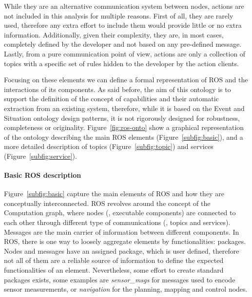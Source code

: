 While they are an alternative communication system between nodes, actions are not included in this analysis for multiple reasons. First of all, they are rarely used, therefore any extra effort to include them would provide little or no extra information. Additionally, given their complexity, they are, in most cases, completely defined by the developer and not based on any pre-defined message. Lastly, from a pure communication point of view, actions are only a collection of topics with a specific set of rules hidden to the developer by the action clients. 

Focusing on these elements we can define a formal representation of ROS and the interactions of its components. As said before, the aim of this ontology is to support the definition of the concept of capabilities and their automatic extraction from an existing system, therefore, while it is based on the Event and Situation ontology design patterns, it is not rigorously designed for robustness, completeness or originality. Figure~\ref{fig:ros-onto} show a graphical representation of the ontology describing the main ROS elements (Figure~\ref{subfig:basic}), and a more detailed description of topics (Figure~\ref{subfig:topic}) and services (Figure~\ref{subfig:service}).

\paragraph{Basic ROS description} Figure~\ref{subfig:basic} capture the main elements of ROS and how they are conceptually interconnected. ROS revolves around the concept of the Computation graph, where nodes (\ie, executable components) are connected to each other through different type of communications (\ie, topics and services). Messages are the main carrier of information between different components. In ROS, there is one way to loosely aggregate elements by functionalities: packages. Nodes and messages have an assigned package, which is user defined, therefore not all of them are a reliable source of information to define the expected functionalities of an element. Nevertheless, some effort to create standard packages exists, some examples are \textit{sensor\_msgs} for messages used to encode sensor measurements, or \textit{navigation} for the planning, mapping and control nodes.

